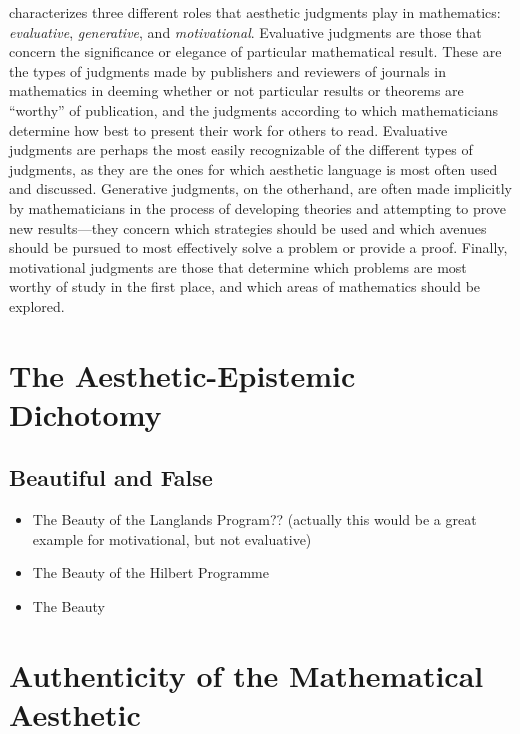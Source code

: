 \documentclass[a4paper,man,natbib]{apa6}
\begin{document}
\cite{sinclair_roles_2004,sinclair_aesthetic_2011} characterizes three different roles that aesthetic judgments play in mathematics:
\textit{evaluative}, \textit{generative}, and \textit{motivational}. Evaluative judgments are those that concern
the significance or elegance of particular mathematical result. These are the types of judgments made by publishers and
reviewers of journals in mathematics in deeming whether or not particular results or theorems are ``worthy'' of 
publication, and the judgments according to which mathematicians determine how best to present their work for 
others to read. Evaluative judgments are perhaps the most easily recognizable
of the different types of judgments, as they are the ones for which aesthetic language is most often used and discussed.
Generative judgments, on the otherhand, are often made implicitly by mathematicians in the process of developing theories
and attempting to prove new results---they concern which strategies should be used and which avenues should be pursued
to most effectively solve a problem or provide a proof. Finally, motivational judgments are those that determine which
problems are most worthy of study in the first place, and which areas of mathematics should be explored.


\section{The Aesthetic-Epistemic Dichotomy}

\subsection{Beautiful and False}

\begin{itemize}
      \item The Beauty of the Langlands Program?? (actually this would be a great example for motivational, but not
            evaluative)
      \item The Beauty of the Hilbert Programme
      \item The Beauty 
\end{itemize}

\section{Authenticity of the Mathematical Aesthetic}
\end{document}
